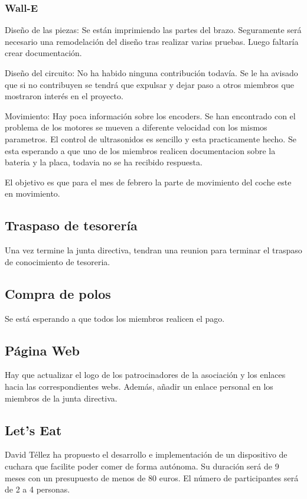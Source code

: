 \documentclass[12pt,twoside,openany,a4paper]{book}
\begin{document}
    \subsubsection{Wall-E}
    Diseño de las piezas: Se están imprimiendo las partes del brazo. Seguramente será necesario una remodelación del diseño tras realizar varias pruebas. Luego faltaría crear documentación.

    Diseño del circuito: No ha habido ninguna contribución todavía. Se le ha avisado que si no contribuyen se tendrá que expulsar y dejar paso a otros miembros que mostraron interés en el proyecto.

    Movimiento: Hay poca información sobre los encoders. Se han encontrado con el problema de los motores se mueven a diferente velocidad con los mismos parametros. El control de ultrasonidos es sencillo y esta practicamente hecho. Se esta esperando a que uno de los miembros realicen documentacion sobre la bateria y la placa, todavia no se ha recibido respuesta.

    El objetivo es que para el mes de febrero la parte de movimiento del coche este en movimiento.

    \subsection{Traspaso de tesorería}
    Una vez termine la junta directiva, tendran una reunion para terminar el traspaso de conocimiento de tesoreria.

    \subsection{Compra de polos}
    Se está esperando a que todos los miembros realicen el pago.

    \subsection{Página Web}
    Hay que actualizar el logo de los patrocinadores de la asociación y los enlaces hacia las correspondientes webs. Además, añadir un enlace personal en los miembros de la junta directiva.

    \subsection{Let's Eat}
    David Téllez ha propuesto el desarrollo e implementación de un dispositivo de cuchara que facilite poder comer de forma autónoma. Su duración será de 9 meses con un presupuesto de menos de 80 euros. El número de participantes será de 2 a 4 personas.
\end{document}
